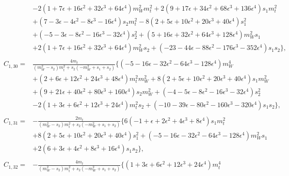 \documentclass[twocolumn,aps,showpacs,nofootinbib,superscriptaddress,prd]{revtex4-2}
\begin{document}
\begin{widetext}
\begin{align}
\nonumber\\&
-2\left(1 +7 \epsilon +16 \epsilon^2 +32 \epsilon^3 +64 \epsilon^4\right)m_W^2m_t^2+2\left(9 +17 \epsilon +34 \epsilon^2 +68 \epsilon^3 +136 \epsilon^4\right)s_1m_t^2
\nonumber\\&
+\left(7 -3 \epsilon -4 \epsilon^2 -8 \epsilon^3 -16 \epsilon^4\right)s_2m_t^2-8\left(2 +5 \epsilon +10 \epsilon^2 +20 \epsilon^3 +40 \epsilon^4\right)s_1^2
\nonumber\\&
+\left(-5 -3 \epsilon -8 \epsilon^2 -16 \epsilon^3 -32 \epsilon^4\right)s_2^2+\left(5 +16 \epsilon +32 \epsilon^2 +64 \epsilon^3 +128 \epsilon^4\right)m_W^2s_1
\nonumber\\&
+2\left(1 +7 \epsilon +16 \epsilon^2 +32 \epsilon^3 +64 \epsilon^4\right)m_W^2s_2+\left(-23 -44 \epsilon -88 \epsilon^2 -176 \epsilon^3 -352 \epsilon^4\right)s_1s_2\}
,\nonumber\\
\nonumber\\
C_{1,30}=&\frac{4m_t}{\left(m_W^2-s_2\right)m_t^2+s_2\left(-m_W^2+s_1+s_2\right)}\{\left(-5 -16 \epsilon -32 \epsilon^2 -64 \epsilon^3 -128 \epsilon^4\right)m_W^4
\nonumber\\&
+\left(2 +6 \epsilon +12 \epsilon^2 +24 \epsilon^3 +48 \epsilon^4\right)m_t^2m_W^2+8\left(2 +5 \epsilon +10 \epsilon^2 +20 \epsilon^3 +40 \epsilon^4\right)s_1m_W^2
\nonumber\\&
+\left(9 +21\epsilon +40 \epsilon^2 +80 \epsilon^3 +160 \epsilon^4\right)s_2m_W^2+\left(-4 -5 \epsilon -8 \epsilon^2 -16 \epsilon^3 -32 \epsilon^4\right)s_2^2
\nonumber\\&
-2\left(1 +3 \epsilon +6 \epsilon^2 +12 \epsilon^3 +24 \epsilon^4\right)m_t^2s_2+\left(-10 -39 \epsilon -80 \epsilon^2 -160 \epsilon^3 -320 \epsilon^4\right)s_1s_2\}
,\nonumber\\
\nonumber\\
C_{1,31}=&-\frac{2m_t}{\left(m_W^2-s_2\right)m_t^2+s_2\left(-m_W^2+s_1+s_2\right)}\{6\left(-1 +\epsilon +2 \epsilon^2 +4 \epsilon^3 +8 \epsilon^4\right)s_1m_t^2
\nonumber\\&
+8\left(2 +5 \epsilon +10 \epsilon^2 +20 \epsilon^3 +40 \epsilon^4\right)s_1^2+\left(-5 -16 \epsilon -32 \epsilon^2 -64 \epsilon^3 -128 \epsilon^4\right)m_W^2s_1
\nonumber\\&
+2\left(6 +3 \epsilon +4 \epsilon^2 +8 \epsilon^3 +16 \epsilon^4\right)s_1s_2\}
,\nonumber\\
\nonumber\\
C_{1,32}=&-\frac{4m_t}{\left(m_W^2-s_2\right)m_t^2+s_2\left(-m_W^2+s_1+s_2\right)}\{\left(1 +3 \epsilon +6 \epsilon^2 +12 \epsilon^3 +24 \epsilon^4\right)m_t^4

\end{align}
\end{widetext}
\end{document}
